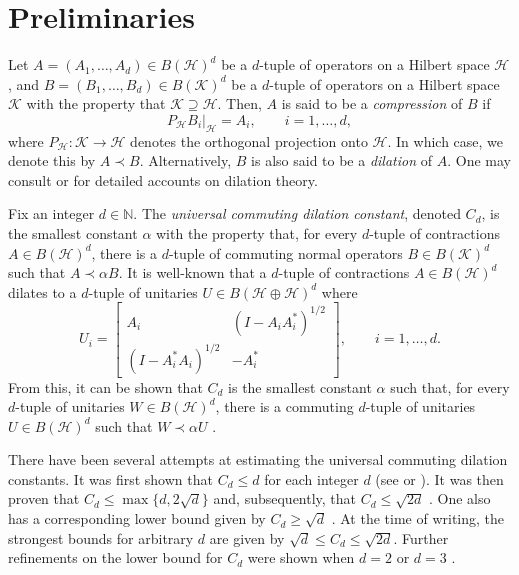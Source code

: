 \documentclass[10pt]{amsart}
\newcommand{\bN}{{\mathbb{N}}}
\renewcommand{\H}{{\mathcal{H}}}
\newcommand{\K}{{\mathcal{K}}}
\begin{document}
\section{Preliminaries}\label{s:prelim}

Let $A = (A_1,\ldots, A_d)\in B(\H)^d$ be a $d$-tuple of operators on a Hilbert space $\H$, and $B = (B_1,\ldots, B_d)\in B(\K)^d$ be a $d$-tuple of operators on a Hilbert space $\K$ with the property that $\K\supseteq\H$. Then, $A$ is said to be a \emph{compression} of $B$ if
\[
    P_\H B_i|_\H = A_i, \qquad i=1,\ldots, d,
\]
where $P_\H:\K\rightarrow\H$ denotes the orthogonal projection onto $\H$. In which case, we denote this by $A\prec B$. Alternatively, $B$ is also said to be a \emph{dilation} of $A$. One may consult \cite{paulsen2002completely} or \cite{shalit2021dilation} for detailed accounts on dilation theory.

Fix an integer $d\in\bN$. The \emph{universal commuting dilation constant}, denoted $C_d$, is the smallest constant $\alpha$ with the property that, for every $d$-tuple of contractions $A\in B(\H)^d$, there is a $d$-tuple of commuting normal operators $B\in B(\K)^d$ such that $A\prec \alpha B$. It is well-known that a $d$-tuple of contractions $A\in B(\H)^d$ dilates to a $d$-tuple of unitaries $U\in B(\H\oplus\H)^d$ where
\[
    U_i = \begin{bmatrix}
        A_i & (I-A_iA_i^*)^{1/2}\\
        (I-A_i^*A_i)^{1/2} & -A_i^*
    \end{bmatrix}, \qquad i=1,\ldots, d.
\]
From this, it can be shown that $C_d$ is the smallest constant $\alpha$ such that, for every $d$-tuple of unitaries $W\in B(\H)^d$, there is a commuting $d$-tuple of unitaries $U\in B(\H)^d$ such that $W\prec \alpha U$ \cite[Remark 1.2]{gerhold2021dilations}.

There have been several attempts at estimating the universal commuting dilation constants. It was first shown that $C_d \leq d$ for each integer $d$ (see \cite[Section 7]{davidson2017dilations} or \cite{helton2019dilations}). It was then proven that $C_d\leq \max\{ d, 2\sqrt{d}\}$ \cite[Corollary 6.11]{passer2018minimal} and, subsequently, that $C_d\leq \sqrt{2d}$ \cite[Theorem 4.4]{passer2019shape}. One also has a corresponding lower bound given by $C_d\geq \sqrt{d}$ \cite{passer2018minimal}. At the time of writing, the strongest bounds for arbitrary $d$ are given by $\sqrt{d}\leq C_d\leq \sqrt{2d}$. Further refinements on the lower bound for $C_d$ were shown when $d=2$ \cite[Section 7]{gerhold2022dilations} or $d=3$ \cite[Corollary 4.7]{gerhold2021dilations}.
\end{document}
